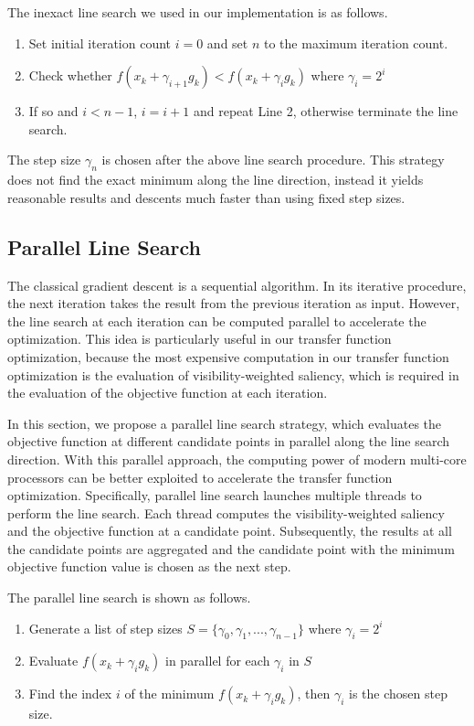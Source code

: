 The inexact line search we used in our implementation is as follows.

\begin{enumerate}
	\item Set initial iteration count $ i=0 $ and set $ n $ to the maximum iteration count.
	\item Check whether $ f(x_{k}+\gamma_{i+1} g_{k}) < f(x_{k}+\gamma_{i} g_{k}) $ where $ \gamma_{i}=2^{i} $
	\item If so and $ i<n-1 $, $ i=i+1 $ and repeat Line 2, otherwise terminate the line search.
\end{enumerate}

The step size $ \gamma_{n} $ is chosen after the above line search procedure.
This strategy does not find the exact minimum along the line direction, instead it yields reasonable results and descents much faster than using fixed step sizes.

\subsection{Parallel Line Search}
The classical gradient descent is a sequential algorithm. In its iterative procedure, the next iteration takes the result from the previous iteration as input.
However, the line search at each iteration can be computed parallel to accelerate the optimization. This idea is particularly useful in our transfer function optimization, because the most expensive computation in our transfer function optimization is the evaluation of visibility-weighted saliency, which is required in the evaluation of the objective function at each iteration.

In this section, we propose a parallel line search strategy, which evaluates the objective function at different candidate points in parallel along the line search direction. With this parallel approach, the computing power of modern multi-core processors can be better exploited to accelerate the transfer function optimization. Specifically, parallel line search launches multiple threads to perform the line search. Each thread computes the visibility-weighted saliency and the objective function at a candidate point. Subsequently, the results at all the candidate points are aggregated and the candidate point with the minimum objective function value is chosen as the next step.

The parallel line search is shown as follows.

\begin{enumerate}
	\item Generate a list of step sizes $ S= \{ \gamma_{0},\gamma_{1},...,\gamma_{n-1} \} $ where $ \gamma_{i}=2^{i} $
	\item Evaluate $ f(x_{k}+\gamma_{i} g_{k}) $ in parallel for each $ \gamma_{i} $ in $ S $
	\item Find the index $ i $ of the minimum $ f(x_{k}+\gamma_{i} g_{k}) $, then $ \gamma_{i} $ is the chosen step size.
\end{enumerate}


